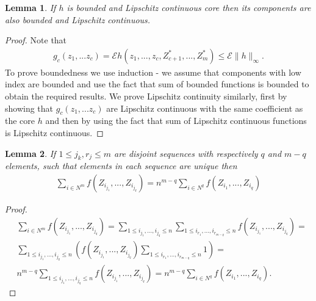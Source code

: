 \documentclass{article} %
\newtheorem{lemma}{Lemma}
\newcommand{\ev}{\mathcal{E}}
\begin{document}
\begin{lemma}
\label{stm:LipAndBound}
 If $h$ is bounded and Lipschitz continuous core then its components are also bounded and Lipschitz continuous.
\end{lemma}
\begin{proof}
 Note that 
\begin{align}
g_c(z_1,...z_c) = \ev h(z_1,...,z_c,Z_{c+1}^*,...,Z_{m}^*) \leq \ev \parallel h \parallel_{\infty}.  
\end{align}
To prove boundedness  we use induction - we assume that components with low index are bounded and use the fact that sum of bounded functions is bounded to obtain the required results.
We prove Lipschitz continuity similarly, first by showing that $g_c(z_1,...z_c)$ are Lipschitz continuous with the same coefficient as the core $h$ and then by using the fact that sum of Lipschitz continuous functions  is  Lipschitz continuous.
\end{proof}


\begin{lemma}
\label{lem:summingLema}
If $1 \leq  j_k,r_j \leq m$ are disjoint sequences with respectively $q$ and $m-q$ elements, such that elements in each sequence are unique then
\begin{align}
\sum_{i \in N^m} f(Z_{i_{j_1}},...,Z_{i_{j_q}}) = n^{m-q} \sum_{i \in N^q} f(Z_{i_1},...,Z_{i_q})
\end{align}
\end{lemma}
\begin{proof}
\begin{align}
&\sum_{i \in N^m} f(Z_{i_{j_1}},...,Z_{i_{j_q}}) = \sum_{1 \leq i_{j_1},...,i_{j_q} \leq n}  \sum_{1 \leq i_{r_1},...,i_{r_{m-q}} \leq n} f(Z_{i_{j_1}},...,Z_{i_{j_q}}) = \\
&\sum_{1 \leq i_{j_1},...,i_{j_q} \leq n}  \left( f(Z_{i_{j_1}},...,Z_{i_{j_q}})  \sum_{1 \leq i_{r_1},...,i_{r_{m-q}} \leq n} 1 \right) =\\
&n^{m-q} \sum_{1 \leq i_{j_1},...,i_{j_q} \leq n}   f(Z_{i_{j_1}},...,Z_{i_{j_q}})  =n^{m-q} \sum_{i \in N^q} f(Z_{i_1},...,Z_{i_q}).
\end{align}
\end{proof}
\end{document}
